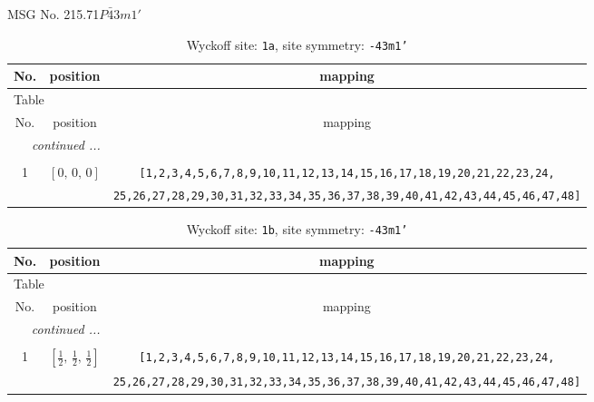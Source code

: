 \documentclass[fleqn,8pt]{jsarticle}
\begin{document}
\setcounter{MaxMatrixCols}{32}

\renewcommand{\tablename}{Table~}
\renewcommand{\figurename}{Figure~}
\begin{center}
\LARGE
MSG No. 215.71\quad$P\bar{4}3m1'$
\end{center}
\renewcommand{\arraystretch}{1.2}
\begin{longtable}{ccc}
\caption{Wyckoff site: {\tt 1a}, site symmetry: {\tt -43m1'}}
 \\
 \hline \hline
No. & position & mapping \\ \hline \endfirsthead

\multicolumn{2}{l}{\tablename\ \thetable{}} \\
 \hline \hline
No. & position & mapping \\ \hline \endhead

 \hline \hline
\multicolumn{2}{r}{\footnotesize\it continued ...} \\ \endfoot

 \hline \hline
\multicolumn{2}{r}{} \\ \endlastfoot

1 & $\left[ 0,\, 0,\, 0 \right]$ & {\tt [1,2,3,4,5,6,7,8,9,10,11,12,13,14,15,16,17,18,19,20,21,22,23,24,} \\ \hline
 &  & {\tt 25,26,27,28,29,30,31,32,33,34,35,36,37,38,39,40,41,42,43,44,45,46,47,48]} \\
\end{longtable}
\renewcommand{\arraystretch}{1.2}
\begin{longtable}{ccc}
\caption{Wyckoff site: {\tt 1b}, site symmetry: {\tt -43m1'}}
 \\
 \hline \hline
No. & position & mapping \\ \hline \endfirsthead

\multicolumn{2}{l}{\tablename\ \thetable{}} \\
 \hline \hline
No. & position & mapping \\ \hline \endhead

 \hline \hline
\multicolumn{2}{r}{\footnotesize\it continued ...} \\ \endfoot

 \hline \hline
\multicolumn{2}{r}{} \\ \endlastfoot

1 & $\left[ \frac{1}{2},\, \frac{1}{2},\, \frac{1}{2} \right]$ & {\tt [1,2,3,4,5,6,7,8,9,10,11,12,13,14,15,16,17,18,19,20,21,22,23,24,} \\ \hline
 &  & {\tt 25,26,27,28,29,30,31,32,33,34,35,36,37,38,39,40,41,42,43,44,45,46,47,48]} \\
\end{longtable}
\end{document}
